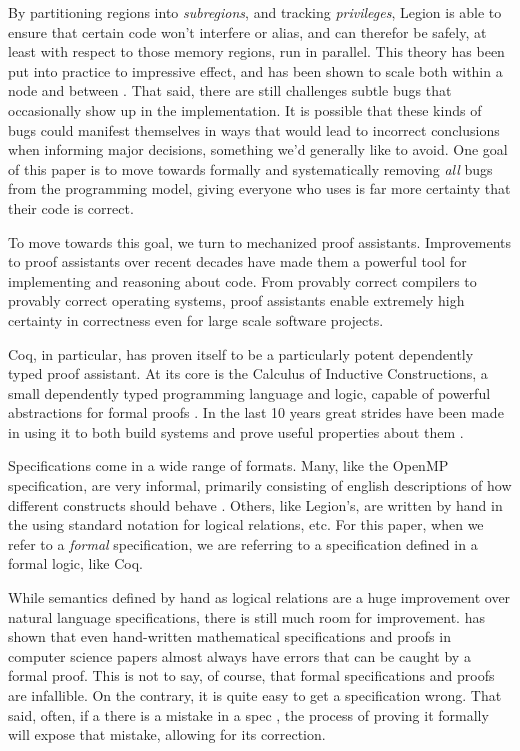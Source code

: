 \documentclass[sigconf]{acmart}
\begin{document}
By partitioning regions into \emph{subregions}, and tracking \emph{privileges}, 
Legion is able to ensure that certain code won't interfere or alias, and can
therefor be safely, at least with respect to those memory regions, run in
parallel. This theory has been put into practice to impressive effect, and has
been shown to scale both within a node and between \cite{legionpapers}. That
said, there are still challenges subtle bugs that occasionally show up in the
implementation. It is possible that these kinds of bugs could manifest
themselves in ways that would lead to incorrect conclusions when informing
major decisions, something we'd generally like to avoid. One goal of this paper
is to move towards formally and systematically removing \emph{all} bugs from
the programming model, giving everyone who uses is far more certainty that 
their code is correct.

To move towards this goal, we turn to mechanized proof assistants.
Improvements to proof assistants over recent decades have made them a powerful
tool for implementing and reasoning about code. From provably correct compilers
to provably correct operating systems, proof assistants enable extremely high
certainty in correctness even for large scale software projects. 

Coq, in particular, has proven itself to be a particularly potent dependently
typed proof assistant. At its core is the Calculus of Inductive Constructions,
a small dependently typed programming language and logic, capable of powerful
abstractions for formal proofs \cite{cic}. In the last 10 years great strides
have been made in using it to both build systems and prove useful properties
about them \cite{compcert, certicoq, chlipala...}. 

Specifications come in a wide range of formats. Many, like the OpenMP
specification, are very informal, primarily consisting of english descriptions
of how different constructs should behave \cite{openmp}. Others, like Legion's,
are written by hand in the using standard notation for logical relations, etc.
For this paper, when we refer to a \emph{formal} specification, we are
referring to a specification defined in a formal logic, like Coq. 

While semantics defined by hand as logical relations are a huge improvement
over natural language specifications, there is still much room for improvement.
\cite{formalspec vs paper} has shown that even hand-written mathematical
specifications and proofs in computer science papers almost always have errors
that can be caught by a formal proof.  This is not to say, of course, that
formal specifications and proofs are infallible.  On the contrary, it is quite
easy to get a specification wrong. That said, often, if a there is a mistake in
a spec , the process of proving it formally will expose that mistake, allowing
for its correction.  
\end{document}
